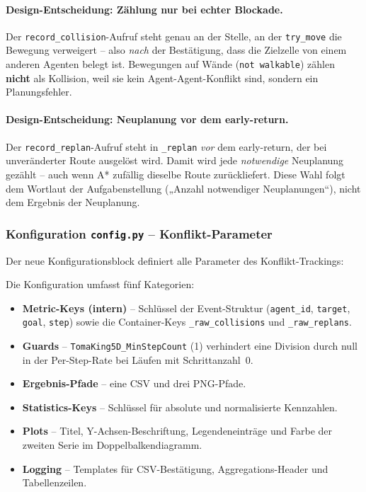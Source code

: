 \paragraph{Design-Entscheidung: Zählung nur bei echter Blockade.}
Der \texttt{record\_collision}-Aufruf steht genau an der Stelle, an der \texttt{try\_move} die Bewegung verweigert -- also \textit{nach} der Bestätigung, dass die Zielzelle von einem anderen Agenten belegt ist. Bewegungen auf Wände (\texttt{not walkable}) zählen \textbf{nicht} als Kollision, weil sie kein Agent-Agent-Konflikt sind, sondern ein Planungsfehler.

\paragraph{Design-Entscheidung: Neuplanung vor dem early-return.}
Der \texttt{record\_replan}-Aufruf steht in \texttt{\_replan} \textit{vor} dem early-return, der bei unveränderter Route ausgelöst wird. Damit wird jede \textit{notwendige} Neuplanung gezählt -- auch wenn A* zufällig dieselbe Route zurückliefert. Diese Wahl folgt dem Wortlaut der Aufgabenstellung („Anzahl notwendiger Neuplanungen``), nicht dem Ergebnis der Neuplanung.


\subsubsection{Konfiguration \texttt{config.py} – Konflikt-Parameter}

Der neue Konfigurationsblock definiert alle Parameter des Konflikt-Trackings:



Die Konfiguration umfasst fünf Kategorien:

\begin{itemize}
    \item \textbf{Metric-Keys (intern)} -- Schlüssel der Event-Struktur (\texttt{agent\_id}, \texttt{target}, \texttt{goal}, \texttt{step}) sowie die Container-Keys \texttt{\_raw\_collisions} und \texttt{\_raw\_replans}.
    \item \textbf{Guards} -- \texttt{TomaKing5D\_MinStepCount} (1) verhindert eine Division durch null in der Per-Step-Rate bei Läufen mit Schrittanzahl~0.
    \item \textbf{Ergebnis-Pfade} -- eine CSV und drei PNG-Pfade.
    \item \textbf{Statistics-Keys} -- Schlüssel für absolute und normalisierte Kennzahlen.
    \item \textbf{Plots} -- Titel, Y-Achsen-Beschriftung, Legendeneinträge und Farbe der zweiten Serie im Doppelbalkendiagramm.
    \item \textbf{Logging} -- Templates für CSV-Bestätigung, Aggregations-Header und Tabellenzeilen.
\end{itemize}

